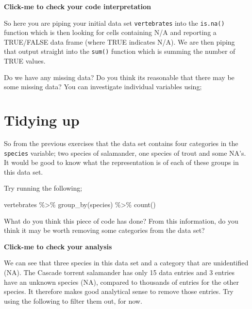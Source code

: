 \documentclass[
]{book}
\newenvironment{Shaded}{\begin{snugshade}}{\end{snugshade}}
\newcommand{\FunctionTok}[1]{\textcolor[rgb]{0.00,0.00,0.00}{#1}}
\newcommand{\NormalTok}[1]{#1}
\newcommand{\SpecialCharTok}[1]{\textcolor[rgb]{0.00,0.00,0.00}{#1}}
\begin{document}
\textbf{Click-me to check your code interpretation}

So here you are piping your initial data set \texttt{vertebrates} into the \texttt{is.na()} function which is then looking for cells containing N/A and reporting a TRUE/FALSE data frame (where TRUE indicates N/A). We are then piping that output straight into the \texttt{sum()} function which is summing the number of TRUE values.

Do we have any missing data? Do you think its reasonable that there may be some missing data? You can investigate individual variables using;

\begin{Shaded}
\end{Shaded}

\hypertarget{tidying-up}{%
\section{Tidying up}\label{tidying-up}}

So from the previous exercises that the data set contains four categories in the \texttt{species} variable; two species of salamander, one species of trout and some NA's. It would be good to know what the representation is of each of these groups in this data set.

Try running the following;

\begin{Shaded}
\begin{Highlighting}[]
\NormalTok{vertebrates }\SpecialCharTok{\%\textgreater{}\%}
  \FunctionTok{group\_by}\NormalTok{(species) }\SpecialCharTok{\%\textgreater{}\%}
  \FunctionTok{count}\NormalTok{()}
\end{Highlighting}
\end{Shaded}

What do you think this piece of code has done? From this information, do you think it may be worth removing some categories from the data set?

\textbf{Click-me to check your analysis}

We can see that three species in this data set and a category that are unidentified (NA). The Cascade torrent salamander has only 15 data entries and 3 entries have an unknown species (NA), compared to thousands of entries for the other species. It therefore makes good analytical sense to remove those entries. Try using the following to filter them out, for now.
\end{document}
